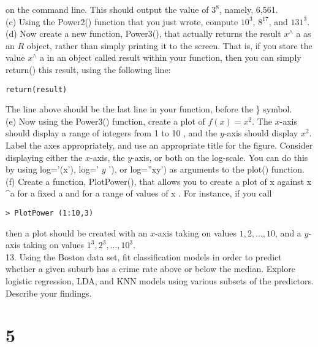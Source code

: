 \documentclass[10pt]{article}
\begin{document}
on the command line. This should output the value of $3^{8}$, namely, 6,561.\\
(c) Using the Power2() function that you just wrote, compute $10^{3}$, $8^{17}$, and $131^{3}$.\\
(d) Now create a new function, Power3(), that actually returns the result $x^{\wedge}$ a as an $R$ object, rather than simply printing it to the screen. That is, if you store the value $x^{\wedge}$ a in an object called result within your function, then you can simply return() this result, using the following line:


\begin{verbatim}
return(result)
\end{verbatim}

The line above should be the last line in your function, before the \} symbol.\\
(e) Now using the Power3() function, create a plot of $f(x)=x^{2}$. The $x$-axis should display a range of integers from 1 to 10 , and the $y$-axis should display $x^{2}$. Label the axes appropriately, and use an appropriate title for the figure. Consider displaying either the $x$-axis, the $y$-axis, or both on the log-scale. You can do this by using log='(x'), log=' $y$ '), or log=''xy') as arguments to the plot() function.\\
(f) Create a function, PlotPower(), that allows you to create a plot of x against x \^{}a for a fixed a and for a range of values of x . For instance, if you call

\begin{verbatim}
> PlotPower (1:10,3)
\end{verbatim}

then a plot should be created with an $x$-axis taking on values $1,2, \ldots, 10$, and a $y$-axis taking on values $1^{3}, 2^{3}, \ldots, 10^{3}$.\\
13. Using the Boston data set, fit classification models in order to predict whether a given suburb has a crime rate above or below the median. Explore logistic regression, LDA, and KNN models using various subsets of the predictors. Describe your findings.


\section*{5}
\end{document}
